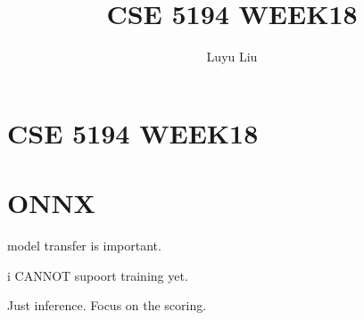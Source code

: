 \documentclass[12pt]{article}
\begin{document}
\author{Luyu Liu}

\newcommand\para{\par\refstepcounter{para}\thepara\space}

\section*{CSE 5194 WEEK18}
\title{CSE 5194 WEEK18}

\section{ONNX}
model transfer is important.

i CANNOT supoort training yet.

Just inference. Focus on the scoring.
\end{document}
